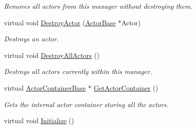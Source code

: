\begin{DoxyCompactItemize}
\begin{DoxyCompactList}\small\item\em Removes all actors from this manager without destroying them. \item\end{DoxyCompactList}\item 
virtual void \hyperlink{classphys_1_1ActorManager_ad6770c0435aef34f359a43f4038b336b}{DestroyActor} (\hyperlink{classphys_1_1ActorBase}{ActorBase} $\ast$Actor)
\begin{DoxyCompactList}\small\item\em Destroys an actor. \item\end{DoxyCompactList}\item 
\hypertarget{classphys_1_1ActorManager_a41f436d640f344000b02978ce6a661e5}{
virtual void \hyperlink{classphys_1_1ActorManager_a41f436d640f344000b02978ce6a661e5}{DestroyAllActors} ()}
\label{d3/dcf/classphys_1_1ActorManager_a41f436d640f344000b02978ce6a661e5}

\begin{DoxyCompactList}\small\item\em Destroys all actors currently within this manager. \item\end{DoxyCompactList}\item 
virtual \hyperlink{classphys_1_1ActorContainerBase}{ActorContainerBase} $\ast$ \hyperlink{classphys_1_1ActorManager_a7159d9d42e15d9963ee6d0989b1fd74a}{GetActorContainer} ()
\begin{DoxyCompactList}\small\item\em Gets the internal actor container storing all the actors. \item\end{DoxyCompactList}\item 
\hypertarget{classphys_1_1ActorManager_a231586ede5669da350ced7f5dcd0bee2}{
virtual void \hyperlink{classphys_1_1ActorManager_a231586ede5669da350ced7f5dcd0bee2}{Initialize} ()}
\label{d3/dcf/classphys_1_1ActorManager_a231586ede5669da350ced7f5dcd0bee2}


\end{DoxyCompactItemize}
